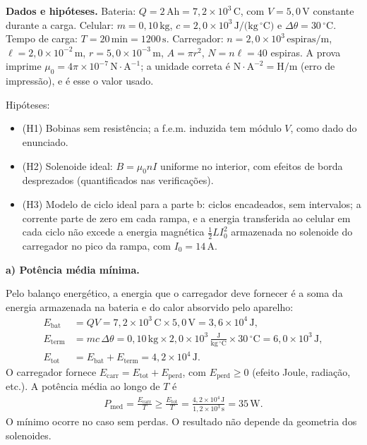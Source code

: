 \documentclass{article}%
\begin{document}
\textbf{Dados e hipóteses.} Bateria: $Q = 2\,\text{Ah} = 7{,}2\times10^{3}\,\text{C}$, com $V = 5{,}0\,\text{V}$ constante durante a carga. Celular: $m = 0{,}10\,\text{kg}$, $c = 2{,}0\times10^{3}\,\text{J/(kg}\,^\circ\text{C)}$ e $\Delta\theta = 30\,^\circ\text{C}$. Tempo de carga: $T = 20\,\text{min} = 1200\,\text{s}$. Carregador: $n = 2{,}0\times10^{3}\,\text{espiras/m}$, $\ell = 2{,}0\times10^{-2}\,\text{m}$, $r = 5{,}0\times10^{-3}\,\text{m}$, $A = \pi r^2$, $N = n\ell = 40$ espiras. A prova imprime $\mu_0 = 4\pi\times10^{-7}\,\text{N}\cdot\text{A}^{-1}$; a unidade correta é $\text{N}\cdot\text{A}^{-2} = \text{H/m}$ (erro de impressão), e é esse o valor usado.

Hipóteses:
\begin{itemize}
\item (H1) Bobinas sem resistência; a f.e.m. induzida tem módulo $V$, como dado do enunciado.
\item (H2) Solenoide ideal: $B = \mu_0 n I$ uniforme no interior, com efeitos de borda desprezados (quantificados nas verificações).
\item (H3) Modelo de ciclo ideal para a parte b: ciclos encadeados, sem intervalos; a corrente parte de zero em cada rampa, e a energia transferida ao celular em cada ciclo não excede a energia magnética $\tfrac12 L I_0^2$ armazenada no solenoide do carregador no pico da rampa, com $I_0 = 14\,\text{A}$.
\end{itemize}

\textbf{a) Potência média mínima.}

Pelo balanço energético, a energia que o carregador deve fornecer é a soma da energia armazenada na bateria e do calor absorvido pelo aparelho:
\begin{align*}
E_{\text{bat}} &= QV = 7{,}2\times10^{3}\,\text{C}\times5{,}0\,\text{V} = 3{,}6\times10^{4}\,\text{J},\\
E_{\text{term}} &= mc\,\Delta\theta = 0{,}10\,\text{kg}\times2{,}0\times10^{3}\,\tfrac{\text{J}}{\text{kg}\,^\circ\text{C}}\times30\,^\circ\text{C} = 6{,}0\times10^{3}\,\text{J},\\
E_{\text{tot}} &= E_{\text{bat}} + E_{\text{term}} = 4{,}2\times10^{4}\,\text{J}.
\end{align*}
O carregador fornece $E_{\text{carr}} = E_{\text{tot}} + E_{\text{perd}}$, com $E_{\text{perd}} \ge 0$ (efeito Joule, radiação, etc.). A potência média ao longo de $T$ é
\begin{align*}
P_{\text{med}} = \frac{E_{\text{carr}}}{T} \ge \frac{E_{\text{tot}}}{T} = \frac{4{,}2\times10^{4}\,\text{J}}{1{,}2\times10^{3}\,\text{s}} = 35\,\text{W}.
\end{align*}
O mínimo ocorre no caso sem perdas. O resultado não depende da geometria dos solenoides.
\end{document}
